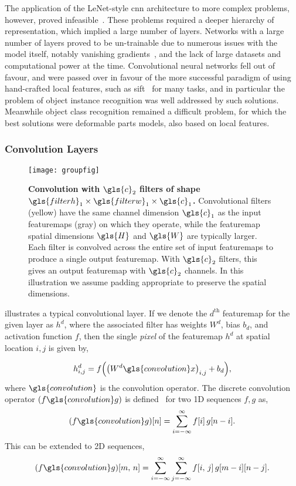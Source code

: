\documentclass[thesis]{subfiles}
\begin{document}
The application of the LeNet-style \gls{cnn} architecture to more complex problems, however, proved infeasible~\citep{goodfellow2016deep}. These problems required a deeper hierarchy of representation, which implied a large number of layers. Networks with a large number of layers proved to be un-trainable due to numerous issues with the model itself, notably vanishing gradients~\citep{hochreiter1991untersuchungen}, and the lack of large datasets and computational power at the time. Convolutional neural networks fell out of favour, and were passed over in favour of the more successful paradigm of using hand-crafted local features, such as \gls{sift}~\citep{Lowe2004} for many tasks, and in particular the problem of object instance recognition was well addressed by such solutions. Meanwhile object class recognition remained a difficult problem, for which the best solutions were deformable parts models, also based on local features.

\subsubsection{Convolution Layers}
\begin{figure}[tb]
	\centering
	\texttt{[image: groupfig]}
	\caption[Illustration of convolutional layer]{\textbf{Convolution with $\gls{c}_2$ filters of shape $\gls{filterh}_1\times \gls{filterw}_1\times \gls{c}_1$.} Convolutional filters (yellow) have the same channel dimension $\gls{c}_1$ as the input \glspl{featuremap} (gray) on which they operate, while the \gls{featuremap} spatial dimensions $\gls{H}$ and $\gls{W}$ are typically larger. Each filter is convolved across the entire set of input \glspl{featuremap} to produce a single output \gls{featuremap}. With $\gls{c}_2$ filters, this gives an output \gls{featuremap} with $\gls{c}_2$ channels. In this illustration we assume padding appropriate to preserve the spatial dimensions.}\label{fig:convlayer}
\end{figure}
%
 illustrates a typical convolutional layer. If we denote the $d^{\text{th}}$ \gls{featuremap} for the given layer as $h^d$, where the associated filter has weights $W^d$, bias $b_d$, and activation function $f$, then the single \emph{pixel} of the \gls{featuremap} $h^d$ at spatial location $i, j$ is given by,

\begin{equation}
	h^d_{i,j} = f{\left( {\left(W^d \gls{convolution} x \right)}_{i,j} + b_d \right)},
\end{equation}
%
where $\gls{convolution}$ is the convolution operator. The discrete convolution operator $(f \gls{convolution} g)$ is defined~\citep{damelin2011} for two 1D sequences $f, g$ as,
\begin{equation}
	(f \gls{convolution} g)[n] = \sum_{i=-\infty}^\infty f[i]\, g[n - i].
\end{equation}
%
This can be extended to 2D sequences,
\begin{equation}
(f \gls{convolution} g)[m,\,n] = \sum_{i=-\infty}^\infty \sum_{j=-\infty}^\infty f[i,\,j]\, g[m - i][n - j].
\end{equation}
%
\end{document}
